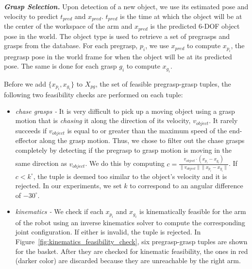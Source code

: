 \documentclass[letterpaper, 10 pt, conference]{ieeeconf}  %
\begin{document}
\textit{\textbf{Grasp Selection.}}  Upon detection of a new object, we
use its estimated pose and velocity to predict $t_{pred}$ and
$x_{pred}$. $t_{pred}$ is the time at which the object will be at the
center of the workspace of the arm and $x_{pred}$ is the predicted
6-DOF object pose in the world. The object type is used to retrieve a
set of pregrasps and grasps from the database. For each pregrasp,
$p_i$, we use $x_{pred}$ to compute $x_{p_i}$, the pregrasp pose in
the world frame for when the object will be at its predicted pose. The
same is done for each grasp $g_i$ to compute $x_{g_i}$.

Before we add $\{x_{p_i}, x_{g_i}\}$ to $X_{pg}$, the set of feasible
pregrasp-grasp tuples, the following two feasibility checks are
performed on each tuple:
\begin{itemize}
\item \textit{chase grasps -} It is very difficult to pick up a moving
  object using a grasp motion that is \textit{chasing} it along the
  direction of its velocity, $v_{object}$.  It rarely succeeds if
  $v_{object}$ is equal to or greater than the maximum speed of the
  end-effector along the grasp motion. Thus, we chose to filter out
  the chase grasps completely by detecting if the pregrasp to grasp
  motion is moving in the same direction as $v_{object}$. We do this
  by computing $c = \frac{v_{object} \cdot (x_{p_i} -
    x_{g_i})}{\|v_{object}\|\|x_{p_i} - x_{g_i}\|}$. If $c <
  k^\circ$, the tuple is deemed too similar to the object's velocity
  and it is rejected. In our experiments, we set $k$ to correspond to
  an angular difference of $-30^\circ$.

 
\item \textit{kinematics -} We check if each $x_{p_i}$ and $x_{g_i}$
  is kinematically feasible for the arm of the robot using an inverse
  kinematics solver to compute the corresponding joint
  configuration. If either is invalid, the tuple is rejected. In
  Figure~\ref{fig:kinematics_feasibility_check}, six pregrasp-grasp
  tuples are shown for the basket. After they are checked for
  kinematic feasibility, the ones in red (darker color) are discarded
  because they are unreachable by the right arm.
\end{itemize}
\end{document}
